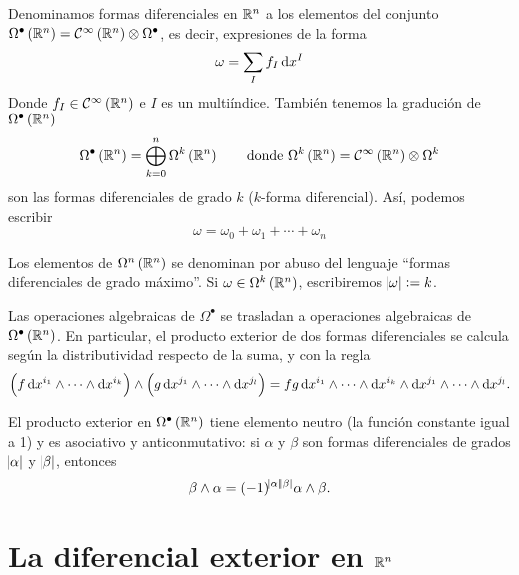 \begin{defi}
    Denominamos formas diferenciales en $\mathbb{R}^n$ a los elementos del conjunto $\Omega^\bullet\left( \mathbb{R}^n \right) = \mathcal{C}^\infty\left( \mathbb{R}^n \right) \otimes
    \Omega^\bullet$, es decir, expresiones de la forma
    \[
        \omega = \sum_I f_I \dif x^I
    \]
    Donde $f_I \in \mathcal{C}^{\infty}\left( \mathbb{R}^n \right)$ e $I$ es un multiíndice. Tambi\'en tenemos la gradución de $\Omega^\bullet \left( \mathbb{R}^n \right)$
    \[
        \Omega^\bullet \left( \mathbb{R}^n \right) = \bigoplus^n_{k=0} \Omega^k \left( \mathbb{R}^n \right) \qquad \text{donde }
        \Omega^k \left( \mathbb{R}^n \right) = \mathcal{C}^\infty \left( \mathbb{R}^n \right) \otimes \Omega^k
    \]
    son las formas diferenciales de grado $k$ ($k$-forma diferencial). Así, podemos escribir
    \[
        \omega = \omega_0 + \omega_1 + \cdots + \omega_n
    \]

    Los elementos de $\Omega^n\left( \mathbb{R}^n \right)$ se denominan por abuso del lenguaje ``formas diferenciales de grado máximo''. Si
    $\omega \in \Omega^k \left( \mathbb{R}^n \right)$, escribiremos $\abs{\omega} := k$.
\end{defi}

\begin{defi}
    Las operaciones algebraicas de $\Omega^\bullet$ se trasladan a operaciones algebraicas de $\Omega^\bullet \left( \mathbb{R}^n \right)$. En particular,
    el producto exterior de dos formas diferenciales se calcula según la distributividad respecto de la suma, y con la regla
    \[
        \left( f \dif x^{i_1} \wedge \cdots \wedge \dif x^{i_k} \right) \wedge \left( g \dif x^{j_1} \wedge \cdots \wedge \dif x^{j_l} \right) =
        fg \dif x^{i_1} \wedge \cdots \wedge \dif x^{i_k} \wedge \dif x^{j_1} \wedge \cdots \wedge \dif x^{j_l}.
    \]
\end{defi}

\begin{prop}
    El producto exterior en $\Omega^\bullet \left( \mathbb{R}^n \right)$ tiene elemento neutro (la función constante igual a 1) y es asociativo
    y anticonmutativo: si $\alpha$ y $\beta$ son formas diferenciales de grados $\abs{\alpha}$ y $\abs{\beta}$, entonces
    \[
        \beta \wedge \alpha = (-1)^{\abs{\alpha}\abs{\beta}} \alpha \wedge \beta.
    \]
\end{prop}

\section{La diferencial exterior en $\mathbb{R}^n$}

